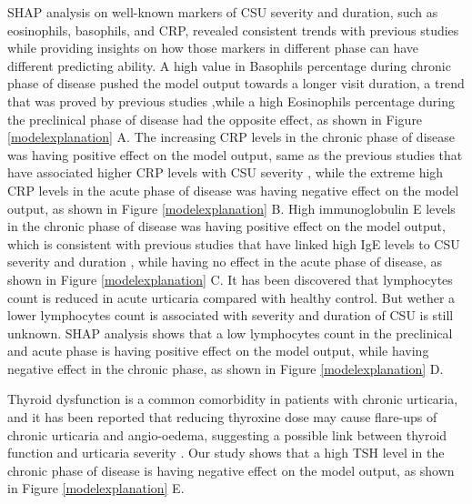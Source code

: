 \documentclass[final,1p,times,authoryear]{elsarticle}
\begin{document}
SHAP analysis on well-known markers of CSU severity and duration, such as eosinophils, basophils, and CRP, revealed consistent trends with previous studies while providing insights on how those markers in different phase can have different predicting ability. 
A high value in Basophils percentage during chronic phase of disease pushed the model output towards a longer visit duration, a trend that was proved by previous studies \citep{SanchezBorges2017Factors},while a high Eosinophils percentage during the preclinical phase of disease had the opposite effect, as shown in Figure \ref{modelexplanation} A.
The increasing CRP levels in the chronic phase of disease was having positive effect on the model output, same as the previous studies that have associated higher CRP levels with CSU severity \citep{Rabelo-Filardi2013Parameters}, while the extreme high CRP levels in the acute phase of disease was having negative effect on the model output, as shown in Figure \ref{modelexplanation} B. 
High immunoglobulin E levels in the chronic phase of disease was having positive effect on the model output, which is consistent with previous studies that have linked high IgE levels to CSU severity and duration \citep{SanchezBorges2017Factors}, while having no effect in the acute phase of disease, as shown in Figure \ref{modelexplanation} C.
It has been discovered that lymphocytes count is reduced in acute urticaria compared with healthy control. But wether a lower lymphocytes count is associated with severity and duration of CSU is still unknown. SHAP analysis shows that a low lymphocytes count in the preclinical and acute phase is having positive effect on the model output, while having negative effect in the chronic phase, as shown in Figure \ref{modelexplanation} D.

Thyroid dysfunction is a common comorbidity in patients with chronic urticaria, and it has been reported that reducing thyroxine dose may cause flare-ups of chronic urticaria and angio-oedema, suggesting a possible link between thyroid function and urticaria severity \citep{Dunkley2003Thyroid}. Our study shows that a high TSH level in the chronic phase of disease is having negative effect on the model output, as shown in Figure \ref{modelexplanation} E.
\end{document}
